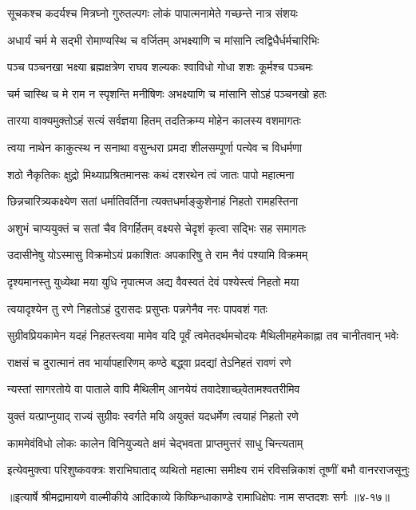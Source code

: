 \twolineshloka
{सूचकश्च कदर्यश्च मित्रघ्नो गुरुतल्पगः}
{लोकं पापात्मनामेते गच्छन्ते नात्र संशयः} %

\twolineshloka
{अधार्यं चर्म मे सद्भी रोमाण्यस्थि च वर्जितम्}
{अभक्ष्याणि च मांसानि त्वद्विधैर्धर्मचारिभिः} %

\twolineshloka
{पञ्च पञ्चनखा भक्ष्या ब्रह्मक्षत्रेण राघव}
{शल्यकः श्वाविधो गोधा शशः कूर्मश्च पञ्चमः} %

\twolineshloka
{चर्म चास्थि च मे राम न स्पृशन्ति मनीषिणः}
{अभक्ष्याणि च मांसानि सोऽहं पञ्चनखो हतः} %

\twolineshloka
{तारया वाक्यमुक्तोऽहं सत्यं सर्वज्ञया हितम्}
{तदतिक्रम्य मोहेन कालस्य वशमागतः} %

\twolineshloka
{त्वया नाथेन काकुत्स्थ न सनाथा वसुन्धरा}
{प्रमदा शीलसम्पूर्णा पत्येव च विधर्मणा} %

\twolineshloka
{शठो नैकृतिकः क्षुद्रो मिथ्याप्रश्रितमानसः}
{कथं दशरथेन त्वं जातः पापो महात्मना} %

\twolineshloka
{छिन्नचारित्र्यकक्ष्येण सतां धर्मातिवर्तिना}
{त्यक्तधर्माङ्कुशेनाहं निहतो रामहस्तिना} %

\twolineshloka
{अशुभं चाप्ययुक्तं च सतां चैव विगर्हितम्}
{वक्ष्यसे चेदृशं कृत्वा सद्भिः सह समागतः} %

\twolineshloka
{उदासीनेषु योऽस्मासु विक्रमोऽयं प्रकाशितः}
{अपकारिषु ते राम नैवं पश्यामि विक्रमम्} %

\twolineshloka
{दृश्यमानस्तु युध्येथा मया युधि नृपात्मज}
{अद्य वैवस्वतं देवं पश्येस्त्वं निहतो मया} %

\twolineshloka
{त्वयादृश्येन तु रणे निहतोऽहं दुरासदः}
{प्रसुप्तः पन्नगेनैव नरः पापवशं गतः} %

\threelineshloka
{सुग्रीवप्रियकामेन यदहं निहतस्त्वया}
{मामेव यदि पूर्वं त्वमेतदर्थमचोदयः}
{मैथिलीमहमेकाह्ना तव चानीतवान् भवेः} %

\twolineshloka
{राक्षसं च दुरात्मानं तव भार्यापहारिणम्}
{कण्ठे बद्ध्वा प्रदद्यां तेऽनिहतं रावणं रणे} %

\twolineshloka
{न्यस्तां सागरतोये वा पाताले वापि मैथिलीम्}
{आनयेयं तवादेशाच्छ्वेतामश्वतरीमिव} %

\twolineshloka
{युक्तं यत्प्राप्नुयाद् राज्यं सुग्रीवः स्वर्गते मयि}
{अयुक्तं यदधर्मेण त्वयाहं निहतो रणे} %

\twolineshloka
{काममेवंविधो लोकः कालेन विनियुज्यते}
{क्षमं चेद्भवता प्राप्तमुत्तरं साधु चिन्त्यताम्} %

\twolineshloka
{इत्येवमुक्त्वा परिशुष्कवक्त्रः शराभिघाताद् व्यथितो महात्मा}
{समीक्ष्य रामं रविसन्निकाशं तूष्णीं बभौ वानरराजसूनुः} %


॥इत्यार्षे श्रीमद्रामायणे वाल्मीकीये आदिकाव्ये किष्किन्धाकाण्डे रामाधिक्षेपः नाम सप्तदशः सर्गः ॥४-१७॥
